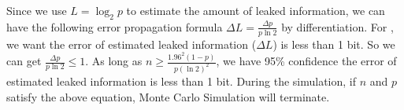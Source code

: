 Since we use $L = \log_{2}p$ to estimate the amount of leaked information,
we can have the following error propagation formula $\Delta L = \frac{\Delta p}{p\ln2}$
by differentiation. For \tool, we want the error of estimated leaked information ($\Delta L$) is 
less than 1 bit. So we can get $\frac{\Delta p}{p\ln2} \leq 1$. As long as
$ n \geq \frac{1.96^2(1-p)}{p(\ln2)^2}$, we have 95\% confidence the error of estimated 
leaked information is less than 1 bit. During the simulation, if $n$ and $p$ satisfy
the above equation, Monte Carlo Simulation will terminate.



